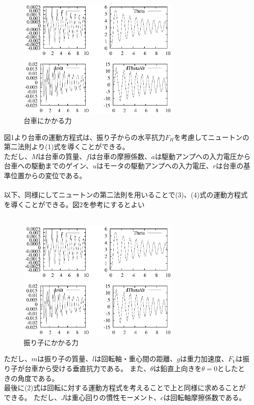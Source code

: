 \documentclass{jarticle}
\begin{document}
\begin{enumerate}
\begin{enumerate}
\begin{enumerate}
					\begin{figure}[htbp]
						\begin{center}
							\includegraphics[width = 8cm]{gazo/InPeAboveNonLiner.eps}
						\end{center}
						\caption{台車にかかる力}
					\end{figure}
					図1より台車の運動方程式は、振り子からの水平抗力$F_{H}$を考慮してニュートンの第二法則より(1)式を導くことができる。\\
					ただし、$M$は台車の質量、$f$は台車の摩擦係数、$a$は駆動アンプへの入力電圧から台車への駆動までのゲイン、$u$はモータの駆動アンプへの入力電圧、$r$は台車の基準位置からの変位である。\\
					\\
					以下、同様にしてニュートンの第二法則を用いることで(3)、(4)式の運動方程式を導くことができる。図2を参考にするとよい\\
					\\
					\begin{figure}[htbp]
						\begin{center}
							\includegraphics[width = 8cm]{gazo/InPeAboveNonLiner.eps}
						\end{center}
						\caption{振り子にかかる力}
					\end{figure}
					ただし、$m$は振り子の質量、$l$は回転軸・重心間の距離、$g$は重力加速度、$F_{V}$は振り子が台車から受ける垂直抗力である。
					また、$\theta$は鉛直上向きを$\theta=0$としたときの角度である。\\
					最後に(2)式は回転に対する運動方程式を考えることで上と同様に求めることができる。
					ただし、$J$は重心回りの慣性モーメント、$c$は回転軸摩擦係数である。\\
					

\end{enumerate}
\end{enumerate}
\end{enumerate}
\end{document}
